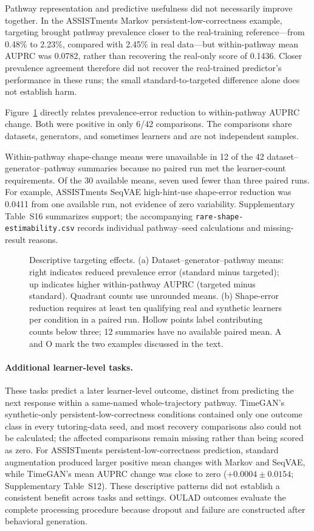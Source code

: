 \documentclass[fleqn,10pt]{JLA_article}
\begin{document}
Pathway representation and predictive usefulness did not necessarily improve together. In the ASSISTments Markov persistent-low-correctness example, targeting brought pathway prevalence closer to the real-training reference---from 0.48\% to 2.23\%, compared with 2.45\% in real data---but within-pathway mean AUPRC was 0.0782, rather than recovering the real-only score of 0.1436. Closer prevalence agreement therefore did not recover the real-trained predictor's performance in these runs; the small standard-to-targeted difference alone does not establish harm.

Figure~\ref{fig:rq2-targeting-effects} directly relates prevalence-error reduction to within-pathway AUPRC change. Both were positive in only 6/42 comparisons. The comparisons share datasets, generators, and sometimes learners and are not independent samples.

Within-pathway shape-change means were unavailable in 12 of the 42 dataset--generator--pathway summaries because no paired run met the learner-count requirements. Of the 30 available means, seven used fewer than three paired runs. For example, ASSISTments SeqVAE high-hint-use shape-error reduction was 0.0411 from one available run, not evidence of zero variability. Supplementary Table~S16 summarizes support; the accompanying \texttt{rare-shape-estimability.csv} records individual pathway--seed calculations and missing-result reasons.

\begin{figure}[!htbp]
\centering
\resizebox{\linewidth}{!}{}
\caption{Descriptive targeting effects. (a) Dataset--generator--pathway means: right indicates reduced prevalence error (standard minus targeted); up indicates higher within-pathway AUPRC (targeted minus standard). Quadrant counts use unrounded means. (b) Shape-error reduction requires at least ten qualifying real and synthetic learners per condition in a paired run. Hollow points label contributing counts below three; 12 summaries have no available paired mean. A and O mark the two examples discussed in the text.}
\label{fig:rq2-targeting-effects}
\end{figure}

\paragraph{Additional learner-level tasks.}
These tasks predict a later learner-level outcome, distinct from predicting the next response within a same-named whole-trajectory pathway. TimeGAN's synthetic-only persistent-low-correctness conditions contained only one outcome class in every tutoring-data seed, and most recovery comparisons also could not be calculated; the affected comparisons remain missing rather than being scored as zero. For ASSISTments persistent-low-correctness prediction, standard augmentation produced larger positive mean changes with Markov and SeqVAE, while TimeGAN's mean AUPRC change was close to zero (\(+0.0004\pm0.0154\); Supplementary Table~S12). These descriptive patterns did not establish a consistent benefit across tasks and settings. OULAD outcomes evaluate the complete processing procedure because dropout and failure are constructed after behavioral generation.
\end{document}
